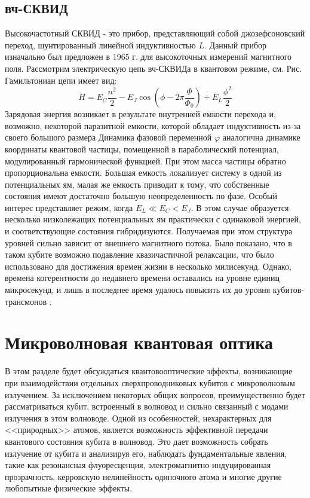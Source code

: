 \subsection{вч-СКВИД}
Высокочастотный СКВИД - это прибор, представляющий собой джозефсоновский переход, шунтированный линейной индуктивностью $L$. Данный прибор изначально был предложен в 1965 г. для высокоточных измерений магнитного поля. Рассмотрим электрическую цепь вч-СКВИДа в квантовом режиме, см. Рис. Гамильтониан цепи имеет вид:
\begin{equation}
H = E_C \frac{n^2}{2} - E_J\cos(\phi - 2\pi\frac{\Phi}{\Phi_0}) + E_L\frac{\phi^2}{2}
\label{eq: rf_squid_ham}
\end{equation}
Зарядовая энергия возникает в результате внутренней емкости перехода и, возможно, некоторой паразитной емкости, которой обладает индуктивность из-за своего большого размера
Динамика фазовой переменной $\varphi$ аналогична динамике координаты квантовой частицы, помещенной в параболический потенциал, модулированный гармонической функцией. При этом масса частицы обратно пропорциональна емкости. Большая емкость локализует систему в одной из потенциальных ям, малая же емкость приводит к тому, что собственные состояния имеют достаточно большую неопределенность по фазе. Особый интерес представляет режим, когда $E_L \ll E_C < E_J$. В этом случае образуется несколько низколежащих потенциальных ям практически с одинаковой энергией, и соответствующие состояния гибридизуются. Получаемая при этом структура уровней сильно зависит от внешнего магнитного потока. Было показано, что в таком кубите возможно подавление квазичастичной релаксации, что было использовано для достижения времен жизни в несколько милисекунд. Однако, времена когерентности до недавнего времени оставались на уровне единиц микросекунд, и лишь в последнее время удалось повысить их до уровня кубитов-трансмонов \cite{grunhaupt2019granular}. 
\section{Микроволновая квантовая оптика}
\label{sec: microwave qo}

В этом разделе будет обсуждаться квантовооптические эффекты, возникающие при взаимодействии отдельных сверхпроводниковых кубитов с микроволновым излучением. За исключением некоторых общих вопросов, преимущественно будет рассматриваться кубит, встроенный в волновод и сильно связанный с модами излучения в этом волноводе. Одной из особенностей, нехарактерных для <<природных>> атомов, является возможность эффективной передачи квантового состояния кубита в волновод. Это дает возможность собрать излучение от кубита и анализируя его, наблюдать фундаментальные явления, такие как резонансная флуоресценция, электромагнитно-индуцированная прозрачность, керровскую нелинейность одиночного атома и многие другие любопытные физические эффекты. 
